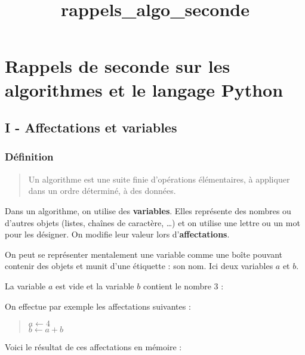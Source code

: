 \documentclass[11pt]{article}
\title{rappels\_algo\_seconde}
\begin{document}
    
    
    \maketitle
    
    

    
    \hypertarget{rappels-de-seconde-sur-les-algorithmes-et-le-langage-python}{%
\section{Rappels de seconde sur les algorithmes et le langage
Python}\label{rappels-de-seconde-sur-les-algorithmes-et-le-langage-python}}

    \hypertarget{i---affectations-et-variables}{%
\subsection{I - Affectations et
variables}\label{i---affectations-et-variables}}

\hypertarget{duxe9finition}{%
\subsubsection{Définition}\label{duxe9finition}}

\begin{quote}
Un algorithme est une suite finie d'opérations élémentaires, à appliquer
dans un ordre déterminé, à des données.
\end{quote}

Dans un algorithme, on utilise des \textbf{variables}. Elles représente
des nombres ou d'autres objets (listes, chaînes de caractère, \ldots{})
et on utilise une lettre ou un mot pour les désigner. On modifie leur
valeur lors d'\textbf{affectations}.

On peut se représenter mentalement une variable comme une boîte pouvant
contenir des objets et munit d'une étiquette : son nom. Ici deux
variables \(a\) et \(b\).

La variable \(a\) est vide et la variable \(b\) contient le nombre \(3\)
:

On effectue par exemple les affectations suivantes :

\begin{quote}
\(a\leftarrow 4\)\\
\(b\leftarrow a+b\)
\end{quote}

Voici le résultat de ces affectations en mémoire :
\end{document}
